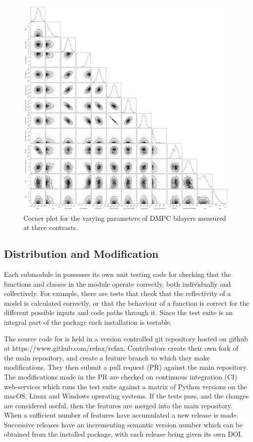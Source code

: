 \documentclass[12pt]{article}
\begin{document}
\begin{figure}
  \includegraphics[width=\linewidth]{./datasets/corner}
  \caption{Corner plot for the varying parameters of DMPC bilayers measured at three contrasts.}
  \label{fig:corner}
\end{figure}

 
\subsection*{Distribution and Modification}
Each submodule in  possesses its own unit testing code for checking that the functions and classes in the module operate correctly, both individually and collectively. For example, there are tests that check that the reflectivity of a model is calculated correctly, or that the behaviour of a function is correct for the different possible inputs and code paths through it. Since the test suite is an integral part of the package each installation is testable.
 
 The source code for  is held in a version controlled git repository hosted on github at https://www.github.com/refnx/refnx. Contributors create their own fork of the main  repository, and create a feature branch to which they make modifications. They then submit a pull request (PR) against the main repository. The modifications made in the PR are checked on continuous integration (CI) web-services which runs the test suite against a matrix of Python versions on the macOS, Linux and Windows operating systems. If the tests pass, and the changes are considered useful, then the features are merged into the main repository. When a sufficient number of features have accumulated a new release is made. Successive releases have an incrementing semantic version number which can be obtained from the installed package, with each release being given its own DOI.
\end{document}
